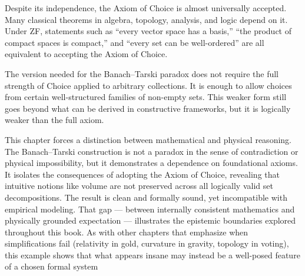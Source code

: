 Despite its independence, the Axiom of Choice is almost universally accepted. Many classical theorems in algebra, topology, analysis, and logic depend on it. Under ZF, statements such as “every vector space has a basis,” “the product of compact spaces is compact,” and “every set can be well-ordered” are all equivalent to accepting the Axiom of Choice.

The version needed for the Banach–Tarski paradox does not require the full strength of Choice applied to arbitrary collections. It is enough to allow choices from certain well-structured families of non-empty sets. This weaker form still goes beyond what can be derived in constructive frameworks, but it is logically weaker than the full axiom.

\begin{commentary}[Commentary]
This chapter forces a distinction between mathematical and physical reasoning. The Banach–Tarski construction is not a paradox in the sense of contradiction or physical impossibility, but it demonstrates a dependence on foundational axioms. It isolates the consequences of adopting the Axiom of Choice, revealing that intuitive notions like volume are not preserved across all logically valid set decompositions. The result is clean and formally sound, yet incompatible with empirical modeling. That gap — between internally consistent mathematics and physically grounded expectation — illustrates the epistemic boundaries explored throughout this book. As with other chapters that emphasize when simplifications fail (relativity in gold, curvature in gravity, topology in voting), this example shows that what appears insane may instead be a well-posed feature of a chosen formal system

\end{commentary}

